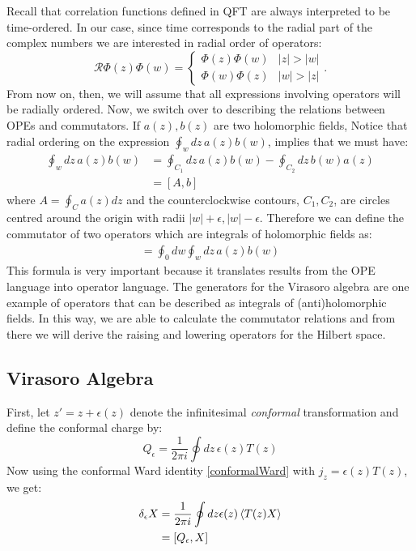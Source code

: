 \documentclass{report}
\theoremstyle{plain}
\theoremstyle{definition}
\theoremstyle{remark}
\newcommand{\FR}[2]{\frac{#1}{#2}}
\newcommand{\mc}{\mathcal}
\begin{document}
Recall that correlation functions defined in QFT are always interpreted to
be time-ordered. In our case, since time corresponds to the radial part of
the complex numbers we are interested in radial order of operators:
\[ \mc R \Phi(z)\Phi(w) = \begin{cases} \Phi(z)\Phi(w)& |z|> |w|\\
\Phi(w)\Phi(z) &|w|>|z|\end{cases}.\]
From now on, then, we will assume that all expressions involving operators
will be radially ordered. Now, we switch over to describing the relations
between OPEs and commutators. If $a(z), b(z)$ are two holomorphic fields,
Notice that radial ordering on the expression $\oint_w dz\, a(z)b(w)$,
implies that we must have:
\begin{align*}
    \oint_w dz\, a(z)b(w) &= \oint_{C_1} dz\, a(z)b(w) - \oint_{C_2} dz\,
    b(w)a(z)\\
    &= [A,b]
\end{align*}
where $A = \oint_C a(z)dz$ and the counterclockwise contours, $C_1,C_2$,
are circles centred around the origin with radii $|w| + \epsilon, |w|
-\epsilon$. Therefore we can define the commutator of two operators which
are integrals of holomorphic fields as:
\begin{align}
    [A,B] = \oint_0 dw \oint_w dz\, a(z)b(w)
    \label{commutatorscountourintegral}
\end{align}
This formula is very important because it translates results from the OPE
language into operator language. The generators for the Virasoro algebra
are one example of operators that can be described as integrals of
(anti)holomorphic fields. In this way, we are able to calculate the
commutator relations and from there we will derive the raising and lowering
operators for the Hilbert space.

\subsection{Virasoro Algebra}
First, let $z' = z+\epsilon(z)$
denote the infinitesimal \emph{conformal} transformation and define the
conformal charge by:
\[ Q_\epsilon = \FR{1}{2\pi i}\oint dz\, \epsilon(z) T(z) \]
Now using the conformal Ward identity \eqref{conformalWard} with $j_z =
\epsilon(z) T(z)$, we get:
\begin{align*}
\delta_\epsilon X &= \FR{1}{2\pi i}\oint dz \epsilon(z) \braket{T(z)X}\\
&= [Q_\epsilon,X]
\end{align*}
\end{document}
